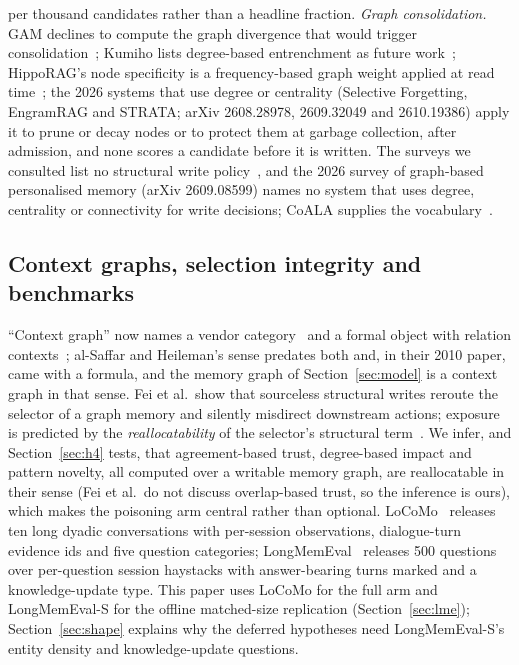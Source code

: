 \documentclass{ceurart}
\begin{document}
per thousand candidates rather than a headline fraction. \emph{Graph consolidation.} GAM declines to compute the graph divergence that would trigger consolidation~\cite{gam2026}; Kumiho lists degree-based entrenchment as future work~\cite{park2026kumiho}; HippoRAG's node specificity is a frequency-based graph weight applied at read time~\cite{gutierrez2024hipporag}; the 2026 systems that use degree or centrality (Selective Forgetting, EngramRAG and STRATA; arXiv 2608.28978, 2609.32049 and 2610.19386) apply it to prune or decay nodes or to protect them at garbage collection, after admission, and none scores a candidate before it is written. The surveys we consulted list no structural write policy~\cite{survey2025rethinking,survey2025memoryage}, and the 2026 survey of graph-based personalised memory (arXiv 2609.08599) names no system that uses degree, centrality or connectivity for write decisions; CoALA supplies the vocabulary~\cite{sumers2024coala}.

\subsection{Context graphs, selection integrity and benchmarks}
``Context graph'' now names a vendor category~\cite{garg2025contextgraphs} and a formal object with relation contexts~\cite{xu2024contextgraph}; al-Saffar and Heileman's sense predates both and, in their 2010 paper, came with a formula, and the memory graph of Section~\ref{sec:model} is a context graph in that sense. Fei et al.\ show that sourceless structural writes reroute the selector of a graph memory and silently misdirect downstream actions; exposure is predicted by the \emph{reallocatability} of the selector's structural term~\cite{fei2026selection,gutierrez2025hipporag2}. We infer, and Section~\ref{sec:h4} tests, that agreement-based trust, degree-based impact and pattern novelty, all computed over a writable memory graph, are reallocatable in their sense (Fei et al.\ do not discuss overlap-based trust, so the inference is ours), which makes the poisoning arm central rather than optional. LoCoMo~\cite{maharana2024locomo} releases ten long dyadic conversations with per-session observations, dialogue-turn evidence ids and five question categories; LongMemEval~\cite{wu2025longmemeval} releases 500 questions over per-question session haystacks with answer-bearing turns marked and a knowledge-update type. This paper uses LoCoMo for the full arm and LongMemEval-S for the offline matched-size replication (Section~\ref{sec:lme}); Section~\ref{sec:shape} explains why the deferred hypotheses need LongMemEval-S's entity density and knowledge-update questions.
\end{document}
